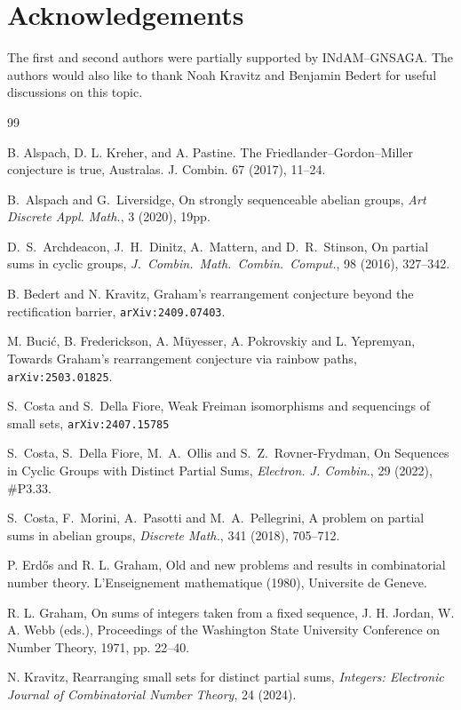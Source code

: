 \documentclass[11pt]{amsart}
\theoremstyle{definition}
\begin{document}
\section{Acknowledgements}
The first and second authors were partially supported by INdAM--GNSAGA.
The authors would also like to thank Noah Kravitz and Benjamin Bedert for useful discussions on this topic.

\begin{thebibliography}{99}

 B. Alspach, D. L. Kreher, and A. Pastine. The Friedlander–Gordon–Miller conjecture is true, Australas. J. Combin. 67 (2017), 11--24.

B.~Alspach and G.~Liversidge, On strongly sequenceable abelian groups, {\em Art Discrete Appl. Math.}, 3 (2020), 19pp.

D.~S.~Archdeacon, J.~H.~Dinitz, A.~Mattern, and D.~R.~Stinson, On partial sums in cyclic groups, {\em J.~Combin.~Math.~Combin.~Comput.}, 98 (2016), 327--342.

 B. Bedert and N. Kravitz, Graham's rearrangement conjecture beyond the rectification barrier, \texttt{arXiv:2409.07403}.

M. Bucić,  B. Frederickson, A. Müyesser, A. Pokrovskiy and L. Yepremyan, Towards Graham's rearrangement conjecture via rainbow paths, \texttt{arXiv:2503.01825}.

S.~Costa and S.~Della Fiore,
Weak Freiman isomorphisms and sequencings of small sets, \texttt{arXiv:2407.15785}

S.~Costa, S.~Della Fiore, M.~A.~Ollis and S.~Z.~Rovner-Frydman,
On Sequences in Cyclic Groups with Distinct Partial Sums, {\em Electron. J. Combin.}, 29 (2022), \#P3.33.

S.~Costa, F.~Morini, A.~Pasotti and M.~A.~Pellegrini, A problem on partial sums in abelian groups, {\em Discrete Math.}, 341 (2018), 705--712.

 P. Erd\H{o}s and R. L. Graham, Old and new problems and results in combinatorial number theory. L’Enseignement mathematique (1980), Universite de Geneve.

 R. L. Graham, On sums of integers taken from a fixed sequence, J. H. Jordan, W. A. Webb (eds.), Proceedings of the Washington State University Conference on Number Theory, 1971, pp. 22--40.

 N. Kravitz, Rearranging small sets for distinct partial sums, \textit{Integers: Electronic Journal of Combinatorial Number Theory}, 24 (2024).


\end{thebibliography}
\end{document}
